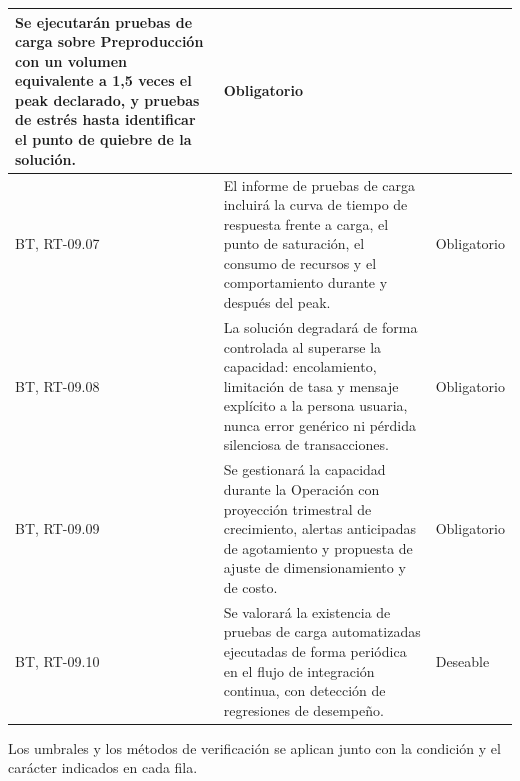 \begin{longtable}{|L{0.098425\AnchoTablaAnexo}|L{0.814961\AnchoTablaAnexo}|L{0.086614\AnchoTablaAnexo}|}
Se ejecutarán pruebas de carga sobre Preproducción con un volumen equivalente a 1,5 veces el peak declarado, y pruebas de estrés hasta identificar el punto de quiebre de la solución. &
Obligatorio \\ \hline
{}
BT, RT-09.07 &
El informe de pruebas de carga incluirá la curva de tiempo de respuesta frente a carga, el punto de saturación, el consumo de recursos y el comportamiento durante y después del peak. &
Obligatorio \\ \hline
BT, RT-09.08 &
La solución degradará de forma controlada al superarse la capacidad: encolamiento, limitación de tasa y mensaje explícito a la persona usuaria, nunca error genérico ni pérdida silenciosa de transacciones. &
Obligatorio \\ \hline
{}
BT, RT-09.09 &
Se gestionará la capacidad durante la Operación con proyección trimestral de crecimiento, alertas anticipadas de agotamiento y propuesta de ajuste de dimensionamiento y de costo. &
Obligatorio \\ \hline
BT, RT-09.10 &
Se valorará la existencia de pruebas de carga automatizadas ejecutadas de forma periódica en el flujo de integración continua, con detección de regresiones de desempeño. &
Deseable \\ \hline
\end{longtable}

Los umbrales y los métodos de verificación se aplican junto con la condición y el carácter indicados en cada fila.
